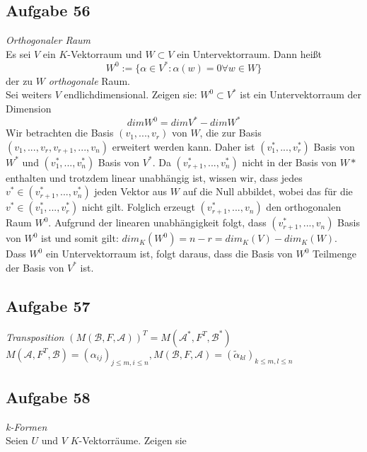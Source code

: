 \documentclass[12pt]{article}
\begin{document}
\subsection*{Aufgabe 56}\textit{Orthogonaler Raum}\\
Es sei $V$ ein $K$-Vektorraum und $W\subset V$ ein Untervektorraum. Dann hei{\ss}t $$W^0:=\{\alpha\in V^*: \alpha(w)=0 \forall w\in W\}$$
der zu $W$ \textit{orthogonale} Raum.\\
Sei weiters $V$ endlichdimensional. Zeigen sie: $W^0\subset V^*$ ist ein Untervektorraum der Dimension $$dim W^0=dimV^* -dimW^*$$
Wir betrachten die Basis $(v_1,...,v_r)$ von $W$, die zur Basis $(v_1,...,v_r,v_{r+1},...,v_n)$ erweitert werden kann. Daher ist $(v_1^*,...,v_r^*)$ Basis von $W^*$ und $(v_1^*,...,v_n^*)$ Basis von $V^*$. Da $(v_{r+1}^*,...,v_n^*)$ nicht in der Basis von $W*$ enthalten und trotzdem linear unabh{\"a}ngig ist, wissen wir, dass jedes $v^*\in(v_{r+1}^*,...,v_n^*)$ jeden Vektor aus $W$ auf die Null abbildet, wobei das f{\"u}r die $ v^*\in(v_1^*,...,v_r^*)$ nicht gilt. Folglich erzeugt $(v_{r+1}^*,...,v_n)$ den orthogonalen Raum $W^0$. Aufgrund der linearen unabh{\"a}ngigkeit folgt, dass $(v_{r+1}^*,...,v_n)$ Basis von $W^0$ ist und somit gilt: $dim_K(W^0)=n-r=dim_K(V)-dim_K(W)$.\\
Dass $W^0$ ein Untervektorraum ist, folgt daraus, dass die Basis von $W^0$ Teilmenge der Basis von $V^*$ ist.
\subsection*{Aufgabe 57}\textit{Transposition}
$(M(\mathcal{B},F,\mathcal{A}))^T=M(\mathcal{A}^*,F^T,\mathcal{B}^*)$\\
$M(\mathcal{A},F^T,\mathcal{B})=(\alpha_{ij})_{j\leq m, i\leq n}, M(\mathcal{B},F,\mathcal{A})=(\tilde{\alpha}_{kl})_{k\leq m, l\leq n}$
\subsection*{Aufgabe 58}\textit{k-Formen}\\
Seien $U$ und $V$ $K$-Vektorr{\"a}ume. Zeigen sie
\end{document}
